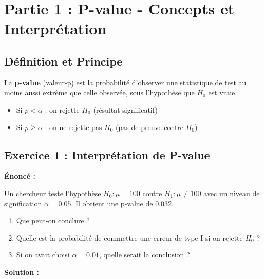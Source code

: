 \documentclass[11pt,a4paper]{article}
\begin{document}
\newpage

\section{Partie 1 : P-value - Concepts et Interprétation}

\subsection{Définition et Principe}

\begin{rappelbox}
La \textbf{p-value} (valeur-p) est la probabilité d'observer une statistique de test au moins aussi extrême que celle observée, sous l'hypothèse que $H_0$ est vraie.

\begin{itemize}
    \item Si $p < \alpha$ : on rejette $H_0$ (résultat significatif)
    \item Si $p \geq \alpha$ : on ne rejette pas $H_0$ (pas de preuve contre $H_0$)
\end{itemize}
\end{rappelbox}

\subsection{Exercice 1 : Interprétation de P-value}

\textbf{Énoncé :}

Un chercheur teste l'hypothèse $H_0 : \mu = 100$ contre $H_1 : \mu \neq 100$ avec un niveau de signification $\alpha = 0.05$. Il obtient une p-value de $0.032$.

\begin{enumerate}
    \item Que peut-on conclure ?
    \item Quelle est la probabilité de commettre une erreur de type I si on rejette $H_0$ ?
    \item Si on avait choisi $\alpha = 0.01$, quelle serait la conclusion ?
\end{enumerate}

\textbf{Solution :}
\end{document}
